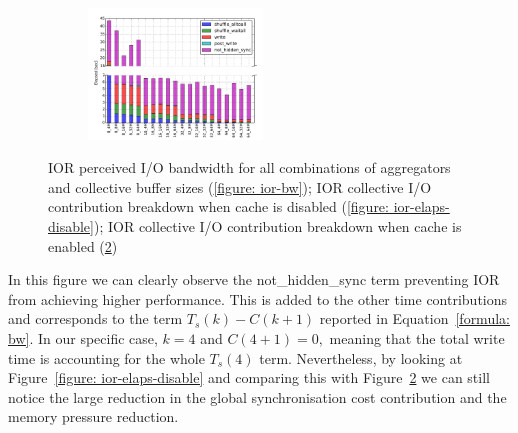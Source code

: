 \begin{figure}[!htb]
\begin{subfigure}[b]{\textwidth}
  \centering
  \includegraphics[width=0.51\textwidth]{chapters/chapter3/figures/ior_32GB_30sec_enable}
  \caption{}
  \label{figure: ior-elaps-enable}
  \end{subfigure}
  \caption{IOR perceived I/O bandwidth for all combinations of aggregators and collective buffer sizes (\ref{figure: ior-bw}); IOR collective I/O contribution breakdown when cache is disabled (\ref{figure: ior-elaps-disable}); IOR collective I/O contribution breakdown when cache is enabled (\ref{figure: ior-elaps-enable})}
\end{figure}
In this figure we can clearly observe the not\_hidden\_sync term preventing IOR from achieving higher performance. This is added to the other time contributions and corresponds to the term $T_s(k)-C(k+1)$ reported in Equation~\ref{formula: bw}. In our specific case, $k = 4$ and $C(4+1) = 0,$ meaning that the total write time is accounting for the whole $T_s(4)$ term. Nevertheless, by looking at Figure~\ref{figure: ior-elaps-disable} and comparing this with Figure~\ref{figure: ior-elaps-enable} we can still notice the large reduction in the global synchronisation cost contribution and the memory pressure reduction.

